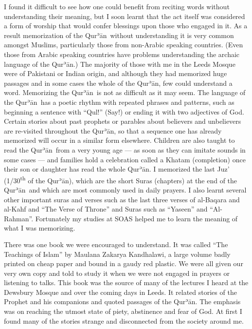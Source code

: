 \documentclass[12pt]{memoir}
\def\´{ʾ} %
\let \Sup=\textsuperscript
\newcommand{\cmt}[2]{#1} %
\def \Quran{Qur\-\´ān} %
\begin{document}
I found it difficult to see how one could benefit from reciting words
without understanding their meaning,
but I soon learnt that the act itself was considered a form of worship
that would confer blessings upon those who engaged in it.
As a result memorization of the \Quran\ without understanding it
is very common amongst Muslims,
particularly those from non-Arabic speaking countries.
(Even those from Arabic speaking countries
have problems understanding the archaic language of the \Quran.)
The majority of those with me in the Leeds Mosque
were of Pakistani or Indian origin,
and although they had memorized huge passages
and in some cases the whole of the \Quran, few could understand a word.
Memorizing the \Quran\ is not as difficult as it may seem.
The language of the \Quran\ has a poetic rhythm
with repeated phrases and patterns,
such as beginning a sentence with “Qul!” (Say!)
or ending it with two adjectives of God.
Certain stories about past prophets or parables about believers
and unbelievers are \cmt{re-visited}{revisited} throughout the \Quran,
so that a sequence one has already memorized
will occur in a similar form elsewhere.
Children are also taught to read the \Quran\ from a very young age —
as soon as they can imitate sounds in some cases —
and families hold a celebration called a Khatam (completion)
once their son or daughter has read the whole \Quran.
I memorized the last Juz’ (1/30\Sup{th} of the \Quran),
which are the short Suras (chapters) at the end of the \Quran\
and which are most commonly used in daily prayers.
I also learnt several other important suras and verses
such as the last three verses of al-Baqara and al-Kahf and
“The Verse of Throne” and Suras such as “Yaseen” and “Al-Rahman”.
Fortunately my studies at SOAS helped me
to learn the meaning of what I was memorizing.

There was one book we were encouraged to understand.
It was called “The Teachings of Islam”
by Maulana Zakarya {Kandhalawi}, %
a large volume badly printed on cheap paper and bound in a gaudy red plastic.
We were all given our very own copy and told to study it
when we were not engaged in prayers or listening to talks.
This book was the source of many of the lectures
I heard at the Dewsbury Mosque and over the coming days in Leeds.
It related stories of the Prophet and his companions
and quoted passages of the \Quran.
The emphasis was on reaching the utmost state of piety,
abstinence and fear of God.
At first I found many of the stories strange
and disconnected from the society around me.
\end{document}

